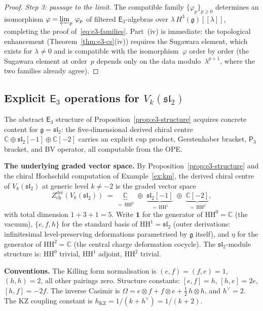 \documentclass[11pt,reqno]{amsart}
\theoremstyle{definition}
\theoremstyle{remark}
\newcommand{\HH}{\mathrm{HH}}
\newcommand{\Ethree}{\mathsf{E}_{3}}
\newcommand{\Pthree}{\mathsf{P}_{3}}
\newcommand{\fg}{\mathfrak{g}}
\newcommand{\CC}{\mathbb{C}}
\numberwithin{equation}{section}
\begin{document}
\begin{proof}
\smallskip
\noindent\textit{Step 3: passage to the limit.}
The compatible family $\{\varphi_p\}_{p \geq 0}$
determines an isomorphism
$\varphi = \varprojlim_p\,\varphi_p$
of filtered $\Ethree$-algebras over
$\lambda\,H^3(\fg)[[\lambda]]$, completing the proof
of~\eqref{eq:e3-families}.
Part~(iv) is immediate: the topological enhancement
(Theorem~\ref{thm:e3-cs}(iv)) requires the Sugawara
element, which exists for $\lambda \neq 0$ and is
compatible with the isomorphism~$\varphi$ order by order
(the Sugawara element at order~$p$ depends only on the
data modulo~$\lambda^{p+1}$, where the two families
already agree).
\end{proof}

\subsection{Explicit $\Ethree$ operations for
$V_k(\mathfrak{sl}_2)$}
\label{subsec:e3-explicit}

The abstract $\Ethree$ structure of
Proposition~\ref{prop:e3-structure} acquires concrete content
for $\fg = \mathfrak{sl}_2$: the five-dimensional derived
chiral centre $\CC \oplus \mathfrak{sl}_2[-1] \oplus \CC[-2]$
carries an explicit cup product, Gerstenhaber bracket,
$\Pthree$ bracket, and BV operator, all computable from the
OPE.

\medskip
\noindent
\textbf{The underlying graded vector space.}
By Proposition~\ref{prop:e3-structure} and the chiral
Hochschild computation of
Example~\ref{ex:km}, the derived chiral centre of
$V_k(\mathfrak{sl}_2)$ at generic level
$k \neq -2$ is the graded vector space
\begin{equation}\label{eq:e3-graded-space}
  Z^{\mathrm{der}}_{\mathrm{ch}}(V_k(\mathfrak{sl}_2))
  \;=\;
  \underbrace{\CC}_{=\, \HH^0}
  \;\oplus\;
  \underbrace{\mathfrak{sl}_2[-1]}_{=\, \HH^1}
  \;\oplus\;
  \underbrace{\CC[-2]}_{=\, \HH^2},
\end{equation}
with total dimension $1 + 3 + 1 = 5$. Write $\mathbf{1}$
for the generator of $\HH^0 = \CC$ (the vacuum),
$\{e, f, h\}$ for the standard basis of
$\HH^1 = \mathfrak{sl}_2$
(outer derivations: infinitesimal level-preserving
deformations parametrised by $\fg$ itself), and $\eta$
for the generator of $\HH^2 = \CC$
(the central charge deformation cocycle). The
$\mathfrak{sl}_2$-module structure is: $\HH^0$ trivial,
$\HH^1$ adjoint, $\HH^2$ trivial.

\medskip
\noindent
\textbf{Conventions.}
The Killing form normalisation is
$(e, f) = (f, e) = 1$, $(h, h) = 2$, all other pairings zero.
Structure constants: $[e, f] = h$, $[h, e] = 2e$,
$[h, f] = -2f$. The inverse Casimir is
$\Omega = e \otimes f + f \otimes e
+ \tfrac{1}{2}\,h \otimes h$, and $h^\vee = 2$.
The KZ coupling constant is
$h_{\mathrm{KZ}} = 1/(k + h^\vee) = 1/(k + 2)$.
\end{document}
